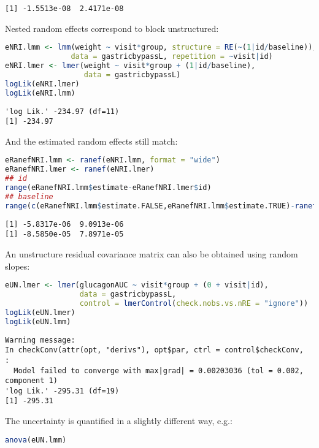 \documentclass[12pt]{article}
\begin{document}
\label{}
\begin{verbatim}
[1] -1.5513e-08  2.4171e-08
\end{verbatim}


Nested random effects correspond to block unstructured:
\begin{lstlisting}[language=r,numbers=none]
eNRI.lmm <- lmm(weight ~ visit*group, structure = RE(~(1|id/baseline)),
               data = gastricbypassL, repetition = ~visit|id)
eNRI.lmer <- lmer(weight ~ visit*group + (1|id/baseline),
                  data = gastricbypassL)
logLik(eNRI.lmer)
logLik(eNRI.lmm)
\end{lstlisting}

\label{}
\begin{verbatim}
'log Lik.' -234.97 (df=11)
[1] -234.97
\end{verbatim}


And the estimated random effects still match:
\begin{lstlisting}[language=r,numbers=none]
eRanefNRI.lmm <- ranef(eNRI.lmm, format = "wide")
eRanefNRI.lmer <- ranef(eNRI.lmer)
## id
range(eRanefNRI.lmm$estimate-eRanefNRI.lmer$id)
## baseline
range(c(eRanefNRI.lmm$estimate.FALSE,eRanefNRI.lmm$estimate.TRUE)-ranef(eNRI.lmer)$`baseline:id`)
\end{lstlisting}

\label{}
\begin{verbatim}
[1] -5.8317e-06  9.0913e-06
[1] -8.5850e-05  7.8971e-05
\end{verbatim}


\clearpage

An unstructure residual covariance matrix can also be obtained using
random slopes:
\begin{lstlisting}[language=r,numbers=none]
eUN.lmer <- lmer(glucagonAUC ~ visit*group + (0 + visit|id),
                 data = gastricbypassL,
                 control = lmerControl(check.nobs.vs.nRE = "ignore"))
logLik(eUN.lmer)
logLik(eUN.lmm)
\end{lstlisting}

\label{}
\begin{verbatim}
Warning message:
In checkConv(attr(opt, "derivs"), opt$par, ctrl = control$checkConv,  :
  Model failed to converge with max|grad| = 0.00203036 (tol = 0.002, component 1)
'log Lik.' -295.31 (df=19)
[1] -295.31
\end{verbatim}


The uncertainty is quantified in a slightly different way, e.g.:
\begin{lstlisting}[language=r,numbers=none]
anova(eUN.lmm)
\end{lstlisting}
\end{document}
